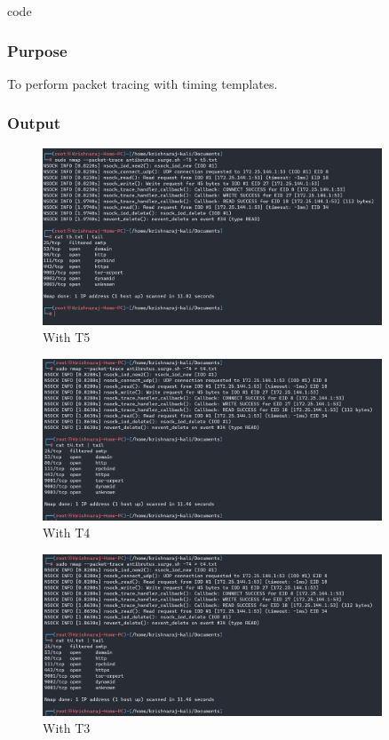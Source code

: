 code \documentclass[11pt]{article}
\begin{document}
\subsubsection*{Purpose}
To perform packet tracing with timing templates.

\subsubsection*{Output}
\begin{figure}[H]
    \centering
    \includegraphics[width=0.9\textwidth]{t5.png}
    \caption{With T5}
    \label{fig:1}
\end{figure}
\begin{figure}[H]
    \centering
    \includegraphics[width=0.9\textwidth]{t4.png}
    \caption{With T4}
    \label{fig:1}
\end{figure}
\begin{figure}[H]
    \centering
    \includegraphics[width=0.9\textwidth]{t3.png}
    \caption{With T3}
    \label{fig:1}
\end{figure}
\end{document}
